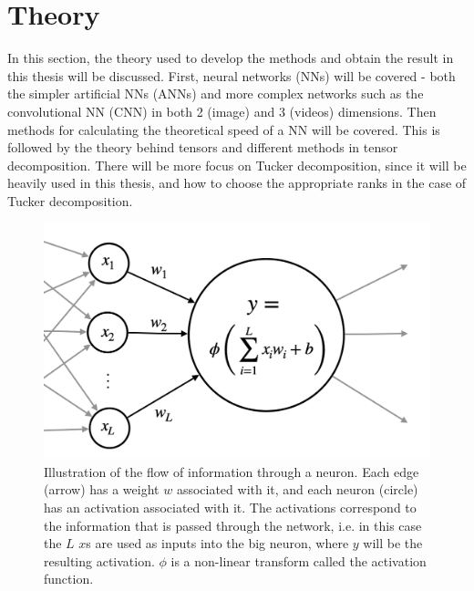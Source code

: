 \section{Theory} \label{tex:theory}
In this section, the theory used to develop the methods and obtain the result in this thesis will be discussed. First, neural networks (NNs) will be covered - both the simpler artificial NNs (ANNs) and more complex networks such as the convolutional NN (CNN) in both 2 (image) and 3 (videos) dimensions. Then methods for calculating the theoretical speed of a NN will be covered. This is followed by the theory behind tensors and different methods in tensor decomposition. There will be more focus on Tucker decomposition, since it will be heavily used in this thesis, and how to choose the appropriate ranks in the case of Tucker decomposition.
\begin{figure}[H]
    \centering
    \captionsetup{width=.95\linewidth}
    \includegraphics[width=.7\linewidth]{Pics/02_Theory/activation_illustration.png}
    \caption{Illustration of the flow of information through a neuron. Each edge (arrow) has a weight $w$ associated with it, and each neuron (circle) has an activation associated with it. The activations correspond to the information that is passed through the network, i.e. in this case the $L$ $x$s are used as inputs into the big neuron, where $y$ will be the resulting activation. $\phi$ is a non-linear transform called the activation function.}
    \label{fig:activation_illustration}
\end{figure}


